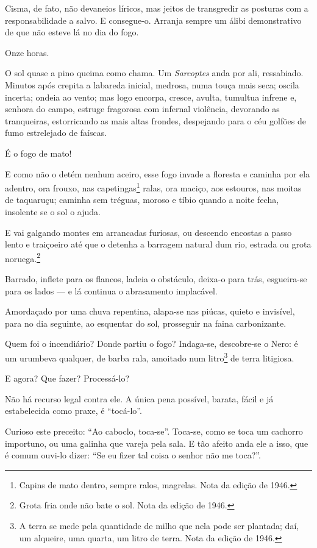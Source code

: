 Cisma, de fato, não devaneios líricos, mas jeitos de transgredir as
posturas com a responsabilidade a salvo. E consegue-o. Arranja sempre um
álibi demonstrativo de que não esteve lá no dia do fogo.

Onze horas.

O sol quase a pino queima como chama. Um \emph{Sarcoptes} anda por ali,
ressabiado. Minutos após crepita a labareda inicial, medrosa, numa touça
mais seca; oscila incerta; ondeia ao vento; mas logo encorpa, cresce,
avulta, tumultua infrene e, senhora do campo, estruge fragorosa com
infernal violência, devorando as tranqueiras, estorricando as mais altas
frondes, despejando para o céu golfões de fumo estrelejado de faíscas.

É o fogo de mato!

E como não o detém nenhum aceiro, esse fogo invade a floresta e caminha
por ela adentro, ora frouxo, nas capetingas\footnote{Capins de mato
  dentro, sempre ralos, magrelas. Nota da edição de 1946.} ralas, ora
maciço, aos estouros, nas moitas de taquaruçu; caminha sem tréguas,
moroso e tíbio quando a noite fecha, insolente se o sol o ajuda.

E vai galgando montes em arrancadas furiosas, ou descendo encostas a
passo lento e traiçoeiro até que o detenha a barragem natural dum rio,
estrada ou grota noruega.\footnote{Grota fria onde não bate o sol. Nota
  da edição de 1946.}

Barrado, inflete para os flancos, ladeia o obstáculo, deixa-o para trás,
esgueira-se para os lados --- e lá continua o abrasamento implacável.

Amordaçado por uma chuva repentina, alapa-se nas piúcas, quieto e
invisível, para no dia seguinte, ao esquentar do sol, prosseguir na
faina carbonizante.

Quem foi o incendiário? Donde partiu o fogo? Indaga-se, descobre-se o
Nero: é um urumbeva qualquer, de barba rala, amoitado num
litro\footnote{A terra se mede pela quantidade de milho que nela pode
  ser plantada; daí, um alqueire, uma quarta, um litro de terra. Nota da
  edição de 1946.} de terra litigiosa.

E agora? Que fazer? Processá-lo?

Não há recurso legal contra ele. A única pena possível, barata, fácil e
já estabelecida como praxe, é ``tocá-lo''.

Curioso este preceito: ``Ao caboclo, toca-se''. Toca-se, como se toca um
cachorro importuno, ou uma galinha que vareja pela sala. E tão afeito
anda ele a isso, que é comum ouvi-lo dizer: ``Se eu fizer tal coisa o
senhor não me toca?''.

